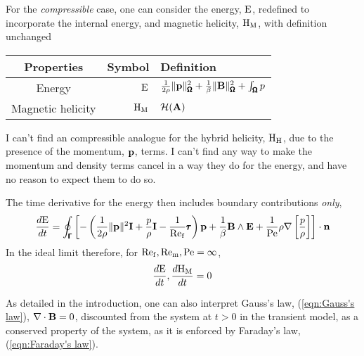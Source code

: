     \line


    For the \emph{compressible} case, one can consider the energy, $\mathrm{E}$, redefined to incorporate the internal energy, and magnetic helicity, $\mathrm{H}_{\mathrm{M}}$, with definition unchanged
    \begin{center}\begin{tabular}{ c | r l }
        Properties  &  Symbol  &  Definition  \\
        \hline\hline
        Energy  &  $\mathrm{E}$  &  $\frac{1}{2\rho}\|\mathbf{p}\|_{\pmb{\mathsf{\Omega}}}^{2} + \frac{1}{\beta}\|\mathbf{B}\|_{\pmb{\mathsf{\Omega}}}^{2} + \int_{\pmb{\mathsf{\Omega}}}p$  \\
        Magnetic helicity  &  $\mathrm{H}_{\mathrm{M}}$  &  $\mathcal{H}(\mathbf{A})$
    \end{tabular}\end{center}
    \begin{remark}
        I can't find an compressible analogue for the hybrid helicity, $\mathrm{H}_{\mathrm{H}}$, due to the presence of the momentum, $\mathbf{p}$, terms. I can't find any way to make the momentum and density terms cancel in a way they do for the energy, and have no reason to expect them to do so.
    \end{remark}
    The time derivative for the energy then includes boundary contributions \emph{only}, 
    \begin{equation}
        \frac{d\mathrm{E}}{dt}  =  \oint_{\pmb{\mathsf{\Gamma}}}\left[- \left(\frac{1}{2\rho}\|\mathbf{p}\|^{2}\mathbf{I} + \frac{p}{\rho}\mathbf{I} - \frac{1}{\mathrm{Re}_{\mathrm{f}}}\pmb{\mathsf{\tau}}\right)\mathbf{p} + \frac{1}{\beta}\mathbf{B}\wedge\mathbf{E} + \frac{1}{\mathrm{Pe}}\rho\nabla\left[\frac{p}{\rho}\right]\right]\cdot\mathbf{n}
    \end{equation}
    In the ideal limit therefore, for $\mathrm{Re}_{\mathrm{f}}, \mathrm{Re}_{\mathrm{m}}, \mathrm{Pe}  =  \infty$, 
    \begin{equation}
        \frac{d\mathrm{E}}{dt}, \frac{d\mathrm{H}_{\mathrm{M}}}{dt}  =  0
    \end{equation}

    As detailed in the introduction, one can also interpret Gauss's law, (\ref{eqn:Gauss's law}), $\nabla\cdot\mathbf{B}  =  0$, discounted from the system at $t  >  0$ in the transient model, as a conserved property of the system, as it is enforced by Faraday's law, (\ref{eqn:Faraday's law}).
    